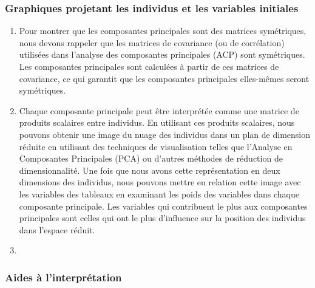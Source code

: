 \documentclass[
]{article}
\begin{document}
\hypertarget{graphiques-projetant-les-individus-et-les-variables-initiales}{%
\subsubsection{Graphiques projetant les individus et les variables
initiales}\label{graphiques-projetant-les-individus-et-les-variables-initiales}}

\begin{enumerate}
\def\labelenumi{\alph{enumi})}
\item
  Pour montrer que les composantes principales sont des matrices
  symétriques, nous devons rappeler que les matrices de covariance (ou
  de corrélation) utilisées dans l'analyse des composantes principales
  (ACP) sont symétriques. Les composantes principales sont calculées à
  partir de ces matrices de covariance, ce qui garantit que les
  composantes principales elles-mêmes seront symétriques.
\item
  Chaque composante principale peut être interprétée comme une matrice
  de produits scalaires entre individus. En utilisant ces produits
  scalaires, nous pouvons obtenir une image du nuage des individus dans
  un plan de dimension réduite en utilisant des techniques de
  visualisation telles que l'Analyse en Composantes Principales (PCA) ou
  d'autres méthodes de réduction de dimensionnalité. Une fois que nous
  avons cette représentation en deux dimensions des individus, nous
  pouvons mettre en relation cette image avec les variables des tableaux
  en examinant les poids des variables dans chaque composante
  principale. Les variables qui contribuent le plus aux composantes
  principales sont celles qui ont le plus d'influence sur la position
  des individus dans l'espace réduit.
\item
\end{enumerate}

\hypertarget{aides-uxe0-linterpruxe9tation}{%
\subsubsection{Aides à
l'interprétation}\label{aides-uxe0-linterpruxe9tation}}
\end{document}
